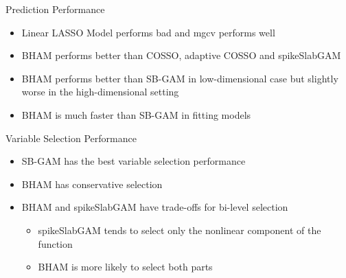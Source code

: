 \documentclass[
  ignorenonframetext,
  aspectratio=169]{beamer}
\providecommand{\tightlist}{%
  \setlength{\itemsep}{0pt}\setlength{\parskip}{0pt}}
\begin{document}
\begin{frame}{Prediction Performance}
\protect\hypertarget{prediction-performance}{}
\begin{itemize}
\tightlist
\item
  Linear LASSO Model performs bad and mgcv performs well
\item
  BHAM performs better than COSSO, adaptive COSSO and spikeSlabGAM
\item
  BHAM performs better than SB-GAM in low-dimensional case but slightly
  worse in the high-dimensional setting
\item
  BHAM is much faster than SB-GAM in fitting models
\end{itemize}
\end{frame}

\begin{frame}{Variable Selection Performance}
\protect\hypertarget{variable-selection-performance}{}
\begin{itemize}
\tightlist
\item
  SB-GAM has the best variable selection performance
\item
  BHAM has conservative selection
\item
  BHAM and spikeSlabGAM have trade-offs for bi-level selection

  \begin{itemize}
  \tightlist
  \item
    spikeSlabGAM tends to select only the nonlinear component of the
    function
  \item
    BHAM is more likely to select both parts
  \end{itemize}
\end{itemize}
\end{frame}
\end{document}
